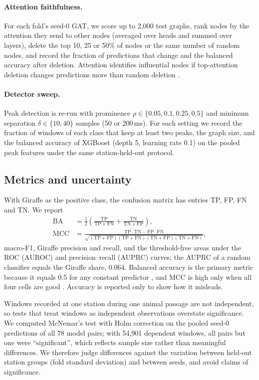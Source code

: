 \documentclass[a4paper,fleqn]{cas-dc}
\begin{document}
\paragraph{Attention faithfulness.} For each fold's seed-0 GAT, we score up to 2,000
test graphs, rank nodes by the attention they send to other nodes (averaged over heads
and summed over layers), delete the top 10, 25 or 50\% of nodes or the same number of
random nodes, and record the fraction of predictions that change and the balanced
accuracy after deletion. Attention identifies influential nodes if top-attention deletion
changes predictions more than random deletion \citep{jain2019}.

\paragraph{Detector sweep.} Peak detection is re-run with prominence
$\rho\in\{0.05,0.1,0.25,0.5\}$ and minimum separation $\delta\in\{10,40\}$ samples
(50 or 200\,ms). For each setting we record the fraction of windows of each class that
keep at least two peaks, the graph size, and the balanced accuracy of XGBoost (depth 5,
learning rate 0.1) on the pooled peak features under the same station-held-out protocol.

\subsection{Metrics and uncertainty}\label{sec:metrics}
With Giraffe as the positive class, the confusion matrix has entries TP, FP, FN and TN.
We report
\begin{align}
\mathrm{BA}&=\tfrac12\!\left(\tfrac{\mathrm{TP}}{\mathrm{TP}+\mathrm{FN}}
+\tfrac{\mathrm{TN}}{\mathrm{TN}+\mathrm{FP}}\right),\\
\mathrm{MCC}&=\frac{\mathrm{TP}\cdot\mathrm{TN}-\mathrm{FP}\cdot\mathrm{FN}}
{\sqrt{(\mathrm{TP}{+}\mathrm{FP})(\mathrm{TP}{+}\mathrm{FN})(\mathrm{TN}{+}\mathrm{FP})(\mathrm{TN}{+}\mathrm{FN})}},
\end{align}
macro-F1, Giraffe precision and recall, and the threshold-free areas under the ROC
(AUROC) and precision--recall (AUPRC) curves; the AUPRC of a random classifier equals the
Giraffe share, 0.064. Balanced accuracy is the primary metric because it equals 0.5 for
any constant predictor \citep{brodersen2010}, and MCC is high only when all four cells
are good \citep{chicco2020}. Accuracy is reported only to show how it misleads.

Windows recorded at one station during one animal passage are not independent, so
tests that treat windows as independent observations overstate significance. We
computed McNemar's test with Holm correction on the pooled seed-0 predictions of all 78
model pairs; with 54,901 dependent windows, all pairs but one were ``significant'',
which reflects sample size rather than meaningful differences. We therefore judge
differences against the variation between held-out station groups (fold standard
deviation) and between seeds, and avoid claims of significance.
\end{document}
